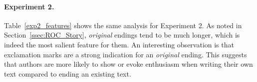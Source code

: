 \documentclass[11pt,a4paper]{article}
\newcommand{\secref}[1]{Section~\ref{ssec:#1}}
\newcommand{\tabref}[1]{Table~\ref{#1}}
\begin{document}
\begin{table*}
\centering
{}
\quad
{}
\caption{
The top 5 most heavily weighted features for predicting {\it right} vs.~{\it wrong} endings (\ref{exp1_features}) and  {\it original} vs.~{\it new} ({\it right}) endings (\ref{exp2_features}). 
{\it length} is the sentence length feature (see \secref{Model}).
}
\end{table*}


\paragraph{Experiment 2.}
\tabref{exp2_features} shows the same analysis for Experiment 2.
As noted in \secref{ROC_Story}, {\it original} endings tend to be much longer, which is indeed the most salient feature for them.
An interesting observation is that exclamation marks are a strong
indication for an  {\it original} ending. 
This suggests that authors are more likely to show or evoke enthusiasm when writing their own text compared to ending an existing text.
\end{document}

